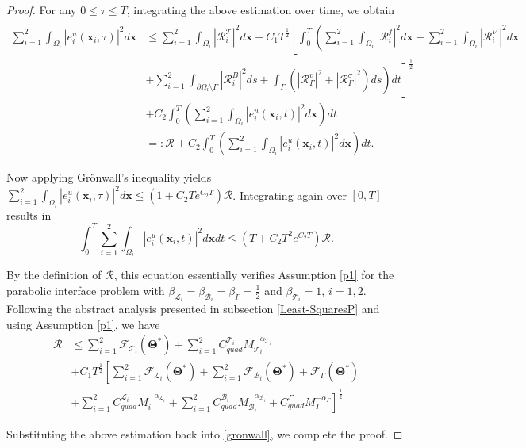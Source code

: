 \documentclass{article}
\newtheorem{proof}{Proof}[section]
\begin{document}
\begin{proof}
For any $0 \leq \tau \leq T$, integrating the above estimation over time, we obtain
\begin{equation}
\begin{aligned}
\sum_{i=1}^{2} \int_{\Omega_i} |e^u_i(\boldsymbol{x}_i, \tau)|^2 d\boldsymbol{x} 
&\leq \sum_{i=1}^{2} \int_{\Omega_i} |\mathcal{R}^{\mathcal{T}}_i|^2 d\boldsymbol{x} + C_1 T^{\frac{1}{2}} \left[ \int_0^T \left( \sum_{i=1}^{2} \int_{\Omega_i} |\mathcal{R}^f_i|^2 d\boldsymbol{x} + \sum_{i=1}^{2} \int_{\Omega_i} |\mathcal{R}^{\nabla}_i|^2 d\boldsymbol{x} \right. \right. \\
&\left. \left. + \sum_{i=1}^{2} \int_{\partial\Omega_i \setminus \Gamma} |\mathcal{R}^{B}_i|^2 ds + \int_{\Gamma} (|\mathcal{R}^v_{\Gamma}|^2 + |\mathcal{R}^{\sigma}_{\Gamma}|^2) ds \right) dt \right]^{\frac{1}{2}} \\
&+ C_2 \int_0^T \left( \sum_{i=1}^{2} \int_{\Omega_i} |e^u_i(\boldsymbol{x}_i, t)|^2 d\boldsymbol{x} \right) dt \\
&=: \mathcal{R} + C_2 \int_0^T \left( \sum_{i=1}^{2} \int_{\Omega_i} |e^u_i(\boldsymbol{x}_i, t)|^2 d\boldsymbol{x} \right) dt.
\end{aligned}
\end{equation}

Now applying Grönwall's inequality yields $\sum_{i=1}^{2} \int_{\Omega_i} |e^u_i(\boldsymbol{x}_i, \tau)|^2 d\boldsymbol{x} \leq (1 + C_2 Te^{C_2 T})\mathcal{R}$. Integrating again over $[0, T]$ results in
\begin{equation}\label{gronwall}
\int_0^T \sum_{i=1}^{2} \int_{\Omega_i} |e^u_i(\boldsymbol{x}_i, t)|^2 d\boldsymbol{x}dt \leq (T + C_2 T^2 e^{C_2 T})\mathcal{R}.
\end{equation}

By the definition of $\mathcal{R}$, this equation essentially verifies Assumption \ref{p1} for the parabolic interface problem with $\beta_{\mathcal{L}_i} = \beta_{\mathcal{B}_i} = \beta_{\Gamma} = \frac{1}{2}$ and $\beta_{\mathcal{T}_i} = 1$, $i = 1, 2$. Following the abstract analysis presented in subsection \ref{Least-SquaresP} and using Assumption \ref{p1}, we have
\begin{equation}
\begin{aligned}
\mathcal{R} &\leq \sum_{i=1}^{2} \mathcal{F}_{\mathcal{T}_i}(\boldsymbol{\Theta}^*) + \sum_{i=1}^{2} C_{quad}^{\mathcal{T}_i}M_{\mathcal{T}_i}^{-\alpha_{\mathcal{T}_i}} \\
&+ C_1 T^{\frac{1}{2}} \left[ \sum_{i=1}^{2} \mathcal{F}_{\mathcal{L}_i}(\boldsymbol{\Theta}^*) + \sum_{i=1}^{2} \mathcal{F}_{\mathcal{B}_i}(\boldsymbol{\Theta}^*) + \mathcal{F}_{\Gamma}(\boldsymbol{\Theta}^*) \right.\\
& \left. + \sum_{i=1}^{2} C_{quad}^{\mathcal{L}_i}M_{i}^{-\alpha_{\mathcal{L}_i}} + \sum_{i=1}^{2} C_{quad}^{\mathcal{B}_i}M_{\mathcal{B}_i}^{-\alpha_{\mathcal{B}_i}} + C_{quad}^{\Gamma}M_{\Gamma}^{-\alpha_{\Gamma}} \right]^{\frac{1}{2}}
\end{aligned}
\end{equation}

Substituting the above estimation back into \eqref{gronwall}, we complete the proof.

\end{proof}
\end{document}
